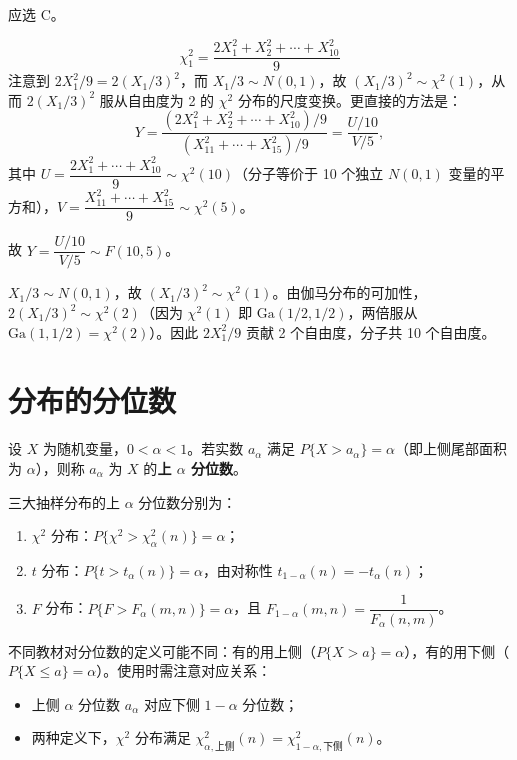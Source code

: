 \documentclass[lang=cn,11pt]{elegantbook}
\begin{document}
\begin{solution}
应选 C。

\[
\chi_1^2 = \frac{2X_1^2+X_2^2+\cdots+X_{10}^2}{9}
\]
注意到 \(2X_1^2/9 = 2(X_1/3)^2\)，而 \(X_1/3 \sim N(0,1)\)，故 \((X_1/3)^2 \sim \chi^2(1)\)，从而 \(2(X_1/3)^2\) 服从自由度为 2 的 \(\chi^2\) 分布的尺度变换。更直接的方法是：
\[
Y = \frac{(2X_1^2+X_2^2+\cdots+X_{10}^2)/9}{(X_{11}^2+\cdots+X_{15}^2)/9} = \frac{U/10}{V/5},
\]
其中 \(U = \dfrac{2X_1^2+\cdots+X_{10}^2}{9} \sim \chi^2(10)\)（分子等价于 10 个独立 \(N(0,1)\) 变量的平方和），\(V = \dfrac{X_{11}^2+\cdots+X_{15}^2}{9} \sim \chi^2(5)\)。

故 \(Y = \dfrac{U/10}{V/5} \sim F(10, 5)\)。

\begin{note}
\(X_1/3 \sim N(0,1)\)，故 \((X_1/3)^2 \sim \chi^2(1)\)。由伽马分布的可加性，\(2(X_1/3)^2 \sim \chi^2(2)\)（因为 \(\chi^2(1)\) 即 \(\text{Ga}(1/2,1/2)\)，两倍服从 \(\text{Ga}(1,1/2)=\chi^2(2)\)）。因此 \(2X_1^2/9\) 贡献 2 个自由度，分子共 10 个自由度。
\end{note}
\end{solution}


\section{分布的分位数}

\begin{definition} \label{def:quantile}
设 \(X\) 为随机变量，\(0 < \alpha < 1\)。若实数 \(a_\alpha\) 满足 \(P\{X > a_\alpha\} = \alpha\)（即上侧尾部面积为 \(\alpha\)），则称 \(a_\alpha\) 为 \(X\) 的\textbf{上 \(\alpha\) 分位数}。
\end{definition}

三大抽样分布的上 \(\alpha\) 分位数分别为：
\begin{enumerate}
    \item \(\chi^2\) 分布：\(P\{\chi^2 > \chi_\alpha^2(n)\} = \alpha\)；
    \item \(t\) 分布：\(P\{t > t_\alpha(n)\} = \alpha\)，由对称性 \(t_{1-\alpha}(n) = -t_\alpha(n)\)；
    \item \(F\) 分布：\(P\{F > F_\alpha(m,n)\} = \alpha\)，且 \(F_{1-\alpha}(m,n) = \dfrac{1}{F_\alpha(n,m)}\)。
\end{enumerate}

\begin{note}
不同教材对分位数的定义可能不同：有的用上侧（\(P\{X > a\} = \alpha\)），有的用下侧（\(P\{X \leq a\} = \alpha\)）。使用时需注意对应关系：
\begin{itemize}
    \item 上侧 \(\alpha\) 分位数 \(a_\alpha\) 对应下侧 \(1-\alpha\) 分位数；
    \item 两种定义下，\(\chi^2\) 分布满足 \(\chi^2_{\alpha,\text{上侧}}(n) = \chi^2_{1-\alpha,\text{下侧}}(n)\)。
\end{itemize}
\end{note}
\end{document}
